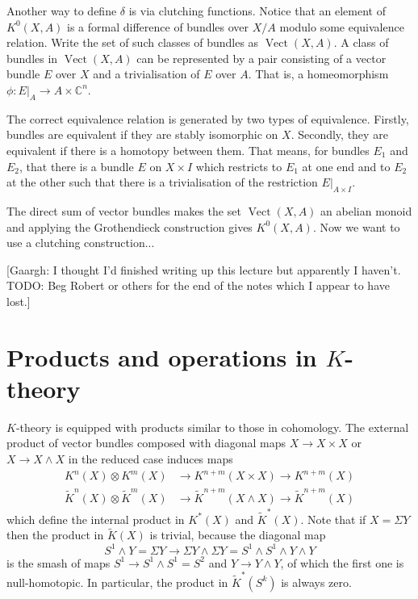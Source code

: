 \documentclass[a4paper,10pt]{article}
\theoremstyle{plain}%
\theoremstyle{definition}
\theoremstyle{remark}
\newcommand{\CC}{\mathbb{C}}
\newcommand{\KR}{\widetilde{K}}   %
\newcommand{\smsh}{\wedge}  %
\newcommand{\susp}{\Sigma}  %
\DeclareMathOperator{\Vect}{Vect}
\begin{document}
Another way to define $\delta$ is via clutching functions. Notice that
an element of $K^0(X,A)$ is a formal difference of bundles over $X/A$
modulo some equivalence relation. Write the set of such classes of
bundles as $\Vect(X,A)$. A class of bundles in $\Vect(X,A)$ can be
represented by a pair consisting of a vector bundle $E$ over $X$ and a
trivialisation of $E$ over $A$. That is, a homeomorphism $\phi:
E|_A\to A\times \CC^n$.

The correct equivalence relation is generated by two types of
equivalence. Firstly, bundles are equivalent if they are stably
isomorphic on $X$. Secondly, they are equivalent if there is a
homotopy between them. That means, for bundles $E_1$ and $E_2$, that
there is a bundle $E$ on $X\times I$ which restricts to $E_1$ at one
end and to $E_2$ at the other such that there is a trivialisation of
the restriction $E|_{A\times I}$.

The direct sum of vector bundles makes the set $\Vect(X,A)$ an abelian
monoid and applying the Grothendieck construction gives
$K^0(X,A)$. Now we want to use a clutching construction...

[Gaargh: I thought I'd finished writing up this lecture but apparently
I haven't. TODO: Beg Robert or others for the end of the notes which I
appear to have lost.]

\section{Products and operations in $K$-theory}

$K$-theory is equipped with products similar to those in cohomology. The external product of vector bundles composed with diagonal maps $X\to X\times X$ or $X\to X\smsh X$ in the reduced case induces maps
\begin{align*}
K^n(X)\otimes K^m(X)&\to K^{n+m}(X\times X)\to K^{n+m}(X)\\
\KR^n(X)\otimes \KR^m(X)&\to \KR^{n+m}(X\smsh X)\to \KR^{n+m}(X)
\end{align*}
which define the internal product in $K^*(X)$ and $\KR^*(X)$. Note that if $X=\susp Y$ then the product in $\KR(X)$ is trivial, because the diagonal map
$$S^1\smsh Y=\susp Y\to \susp Y\smsh \susp Y=S^1\smsh S^1\smsh Y\smsh Y$$
is the smash of maps $S^1\to S^1\smsh S^1=S^2$ and $Y\to Y\smsh Y$, of which the first one is null-homotopic. In particular, the product in $\KR^*(S^k)$ is always zero.
\end{document}
